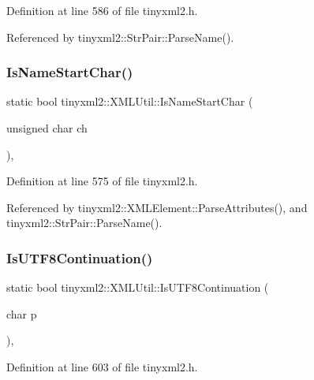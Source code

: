 Definition at line 586 of file tinyxml2.\+h.



Referenced by tinyxml2\+::\+Str\+Pair\+::\+Parse\+Name().

\mbox{\label{classtinyxml2_1_1_x_m_l_util_abe106a69ac4d942a4381a4d9dfd0e0bd}} 
\subsubsection{IsNameStartChar()}
{\footnotesize\ttfamily static bool tinyxml2\+::\+X\+M\+L\+Util\+::\+Is\+Name\+Start\+Char (\begin{DoxyParamCaption}\item[{unsigned char}]{ch }\end{DoxyParamCaption})\hspace{0.3cm}{\ttfamily [inline]}, {\ttfamily [static]}}



Definition at line 575 of file tinyxml2.\+h.



Referenced by tinyxml2\+::\+X\+M\+L\+Element\+::\+Parse\+Attributes(), and tinyxml2\+::\+Str\+Pair\+::\+Parse\+Name().

\mbox{\label{classtinyxml2_1_1_x_m_l_util_ad7fd82e0fe610d73ef7bf9f359f104a3}} 
\subsubsection{IsUTF8Continuation()}
{\footnotesize\ttfamily static bool tinyxml2\+::\+X\+M\+L\+Util\+::\+Is\+U\+T\+F8\+Continuation (\begin{DoxyParamCaption}\item[{char}]{p }\end{DoxyParamCaption})\hspace{0.3cm}{\ttfamily [inline]}, {\ttfamily [static]}}



Definition at line 603 of file tinyxml2.\+h.

\mbox{\label{classtinyxml2_1_1_x_m_l_util_a357ec3af8fc433d19023a815f45e8e33}} 
